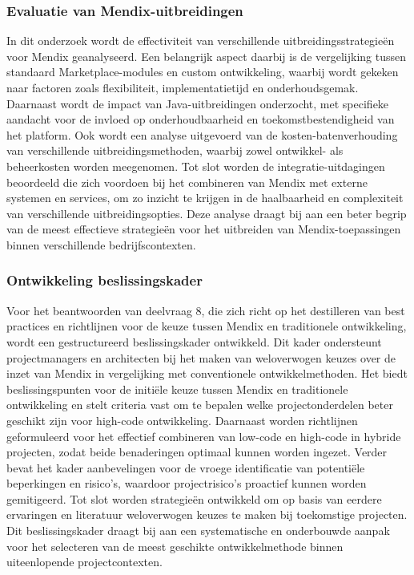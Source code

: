 \subsubsection{Evaluatie van Mendix-uitbreidingen}
In dit onderzoek wordt de effectiviteit van verschillende uitbreidingsstrategieën voor Mendix geanalyseerd. Een belangrijk aspect daarbij is de vergelijking tussen standaard Marketplace-modules en custom ontwikkeling, waarbij wordt gekeken naar factoren zoals flexibiliteit, implementatietijd en onderhoudsgemak. Daarnaast wordt de impact van Java-uitbreidingen onderzocht, met specifieke aandacht voor de invloed op onderhoudbaarheid en toekomstbestendigheid van het platform. Ook wordt een analyse uitgevoerd van de kosten-batenverhouding van verschillende uitbreidingsmethoden, waarbij zowel ontwikkel- als beheerkosten worden meegenomen. Tot slot worden de integratie-uitdagingen beoordeeld die zich voordoen bij het combineren van Mendix met externe systemen en services, om zo inzicht te krijgen in de haalbaarheid en complexiteit van verschillende uitbreidingsopties. Deze analyse draagt bij aan een beter begrip van de meest effectieve strategieën voor het uitbreiden van Mendix-toepassingen binnen verschillende bedrijfscontexten.

\subsubsection{Ontwikkeling beslissingskader}
Voor het beantwoorden van deelvraag 8, die zich richt op het destilleren van best practices en richtlijnen voor de keuze tussen Mendix en traditionele ontwikkeling, wordt een gestructureerd beslissingskader ontwikkeld. Dit kader ondersteunt projectmanagers en architecten bij het maken van weloverwogen keuzes over de inzet van Mendix in vergelijking met conventionele ontwikkelmethoden. Het biedt beslissingspunten voor de initiële keuze tussen Mendix en traditionele ontwikkeling en stelt criteria vast om te bepalen welke projectonderdelen beter geschikt zijn voor high-code ontwikkeling. Daarnaast worden richtlijnen geformuleerd voor het effectief combineren van low-code en high-code in hybride projecten, zodat beide benaderingen optimaal kunnen worden ingezet. Verder bevat het kader aanbevelingen voor de vroege identificatie van potentiële beperkingen en risico’s, waardoor projectrisico’s proactief kunnen worden gemitigeerd. Tot slot worden strategieën ontwikkeld om op basis van eerdere ervaringen en literatuur weloverwogen keuzes te maken bij toekomstige projecten. Dit beslissingskader draagt bij aan een systematische en onderbouwde aanpak voor het selecteren van de meest geschikte ontwikkelmethode binnen uiteenlopende projectcontexten.



